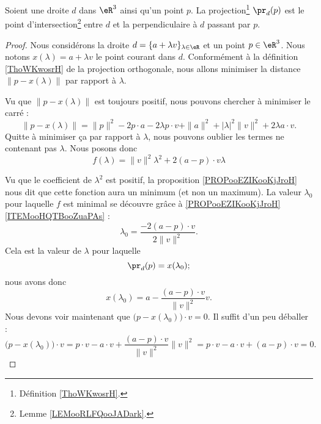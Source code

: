\begin{proposition}     \label{PROPooHGGIooIssaTA}
    Soient une droite \( d\) dans \( \eR^3\) ainsi qu'un point \( p\). La projection\footnote{Définition \ref{ThoWKwosrH}.} \( \pr_d(p)\) est le point d'intersection\footnote{Lemme \ref{LEMooRLFQooJADark}.} entre \( d\) et la perpendiculaire à \( d\) passant par \( p\).
\end{proposition}

\begin{proof}
    Nous considérons la droite \( d=\{ a+\lambda v \}_{\lambda\in \eR}\) et un point \( p\in \eR^3\). Nous notons \( x(\lambda)=a+\lambda v\) le point courant dans \( d\). Conformément à la définition \ref{ThoWKwosrH} de la projection orthogonale, nous allons minimiser la distance \( \| p-x(\lambda) \|\) par rapport à \( \lambda\).

    Vu que \( \| p-x(\lambda) \|\) est toujours positif, nous pouvons chercher à minimiser le carré :
    \begin{equation}
        \| p- x(\lambda) \|=\| p \|^2-2p\cdot a-2\lambda p\cdot v+\| a \|^2+| \lambda |^2\| v \|^2+2\lambda a\cdot v.
    \end{equation}
    Quitte à minimiser ça par rapport à \( \lambda\), nous pouvons oublier les termes ne contenant pas \( \lambda\). Nous posons donc
    \begin{equation}
        f(\lambda)=\| v \|^2\lambda^2+ 2(a-p)\cdot v\lambda
    \end{equation}

    Vu que le coefficient de \( \lambda^2\) est positif, la proposition \ref{PROPooEZIKooKjJroH} nous dit que cette fonction aura un minimum (et non un maximum). La valeur \( \lambda_0\) pour laquelle \( f\) est minimal se découvre grâce à \ref{PROPooEZIKooKjJroH}\ref{ITEMooHQTBooZuaPAs} : 
    \begin{equation}
        \lambda_0=\frac{ -2(a-p)\cdot v }{ 2\| v \|^2 }.
    \end{equation}
    Cela est la valeur de \( \lambda\) pour laquelle
    \begin{equation}
        \pr_d(p)=x(\lambda_0);
    \end{equation}
    nous avons donc
    \begin{equation}
        x(\lambda_0)=a-\frac{ (a-p)\cdot v }{ \| v \|^2 }v.
    \end{equation}
    Nous devons voir maintenant que \( \big( p-x(\lambda_0) \big)\cdot v=0\). Il suffit d'un peu déballer :
    \begin{equation}
        \big( p-x(\lambda_0) \big)\cdot v=p\cdot v-a\cdot v+\frac{ (a-p)\cdot v }{ \| v \|^2 }\| v \|^2=p\cdot v-a\cdot v+(a-p)\cdot v=0.
    \end{equation}
\end{proof}

